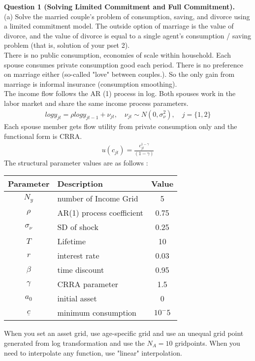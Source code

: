 \documentclass[paper=a4, fontsize=13pt]{extarticle} %
\numberwithin{equation}{section} %
\numberwithin{figure}{section} %
\numberwithin{table}{section} %
\begin{document}
\normalsize
\textbf{Question 1 (Solving Limited Commitment and Full Commitment).} \\
(a) Solve the married couple's problem of consumption, saving, and divorce using a limited commitment model. The outside option of marriage is the value of divorce, and the value of divorce is equal to a single agent's consumption / saving problem (that is, solution of your pset 2).\\
\indent There is no public consumption, economies of scale within household. Each spouse consumes private consumption good each period. There is no preference on marriage either (so-called "love" between couples.). So the only gain from marriage is informal insurance (consumption smoothing). \\
\indent The income flow follows the AR (1) process in log. Both spouses work in the labor market and share the same income process parameters.
\begin{gather}
log y_{jt} = \rho log y_{jt-1} + \nu_{jt}, \quad \nu_{jt} \sim N(0, \sigma_{\nu}^2), \quad j=\{1,2\}
\end{gather}
\indent Each spouse member gets flow utility from private consumption only and the functional form is CRRA.
\begin{gather}
u(c_{jt}) = \frac{c_{jt}^{1-\gamma}}{(1-\gamma)}
\end{gather}
The structural parameter values are as follows : \\
\begin{table}[H]
\centering
\begin{tabular}{c l c}
\hline
Parameter & Description & Value \\
\hline
$N_y$ & number of Income Grid & 5 \\
$\rho$ & AR(1) process coefficient & 0.75 \\
$\sigma_{\nu}$ & SD of shock & 0.25 \\
$T$ & Lifetime & 10 \\
$r$ & interest rate & 0.03 \\
$\beta$ & time discount & 0.95 \\
$\gamma$ & CRRA parameter & 1.5 \\
$a_0$ & initial asset & 0 \\
$\underline{c}$ & minimum consumption & $10^-5$ \\
\hline
\end{tabular}
\end{table}
When you set an asset grid, use age-specific grid and use an unequal grid point generated from log transformation and use the $N_A=10$ gridpoints. When you need to interpolate any function, use "linear" interpolation.\\
\end{document}
